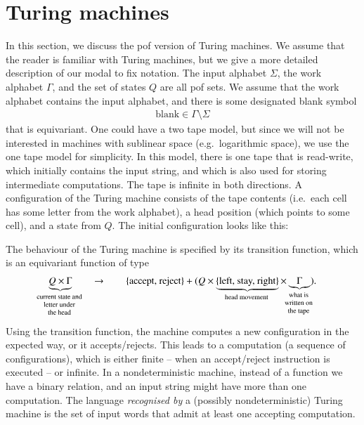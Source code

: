 	  








\section{Turing machines}
\label{sec:pof-turing-machines-equality}
In this section, we discuss the pof version of Turing machines.
We assume that the reader is familiar with Turing machines, but we give a more detailed description of our modal to fix notation.
The input alphabet $\Sigma$, the work alphabet $\Gamma$, and the set of states $Q$ are all pof sets. We assume that the work alphabet contains the input alphabet, and there is some designated blank symbol
\begin{align*}
\text{blank} \in \Gamma \setminus \Sigma
\end{align*}
that is equivariant. One could have a two tape model, but since we will not be interested in machines with sublinear space (e.g.~logarithmic space), we use the one tape model for simplicity. In this model, there is one  tape that is read-write, which initially contains the input string, and which is also used for storing intermediate computations.  The tape is infinite in both directions. A configuration of the Turing machine consists of the tape contents (i.e.~each cell has some letter from the work alphabet), a head position (which points to some cell), and a state from $Q$. The initial configuration looks like this: 

The behaviour of the Turing machine is specified by its transition function, which is an equivariant function of type 
        \begin{gather*}
            \myunderbrace{Q \times \Gamma}{current state and \\ letter  under \\ the head}   
            \qquad \rightarrow \qquad 
            \set{\text{accept, reject}} +  (Q \times
            \myunderbrace{\set{\text{left, stay, right}}}{head movement} \times 
            \myunderbrace{\Gamma}{what is \\ written on \\ the  tape}).
            \end{gather*}
Using the transition function, the machine computes a new configuration in the expected way, or it accepts/rejects. This leads to a computation (a sequence of configurations), which is either finite -- when an accept/reject instruction is executed -- or infinite. 
In a nondeterministic machine, instead of a function we have a binary relation, and an input string might have more than one computation. The language \emph{recognised by}  a (possibly nondeterministic) Turing machine is the set of input words that admit at least one accepting computation.


